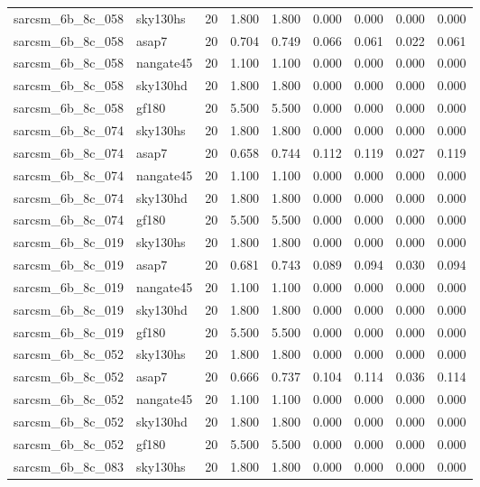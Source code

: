 \begin{tabular}{llrrrrrrr}
sarcsm\_6b\_8c\_058 & sky130hs & 20 & 1.800 & 1.800 & 0.000 & 0.000 & 0.000 & 0.000 \\
sarcsm\_6b\_8c\_058 & asap7 & 20 & 0.704 & 0.749 & 0.066 & 0.061 & 0.022 & 0.061 \\
sarcsm\_6b\_8c\_058 & nangate45 & 20 & 1.100 & 1.100 & 0.000 & 0.000 & 0.000 & 0.000 \\
sarcsm\_6b\_8c\_058 & sky130hd & 20 & 1.800 & 1.800 & 0.000 & 0.000 & 0.000 & 0.000 \\
sarcsm\_6b\_8c\_058 & gf180 & 20 & 5.500 & 5.500 & 0.000 & 0.000 & 0.000 & 0.000 \\
sarcsm\_6b\_8c\_074 & sky130hs & 20 & 1.800 & 1.800 & 0.000 & 0.000 & 0.000 & 0.000 \\
sarcsm\_6b\_8c\_074 & asap7 & 20 & 0.658 & 0.744 & 0.112 & 0.119 & 0.027 & 0.119 \\
sarcsm\_6b\_8c\_074 & nangate45 & 20 & 1.100 & 1.100 & 0.000 & 0.000 & 0.000 & 0.000 \\
sarcsm\_6b\_8c\_074 & sky130hd & 20 & 1.800 & 1.800 & 0.000 & 0.000 & 0.000 & 0.000 \\
sarcsm\_6b\_8c\_074 & gf180 & 20 & 5.500 & 5.500 & 0.000 & 0.000 & 0.000 & 0.000 \\
sarcsm\_6b\_8c\_019 & sky130hs & 20 & 1.800 & 1.800 & 0.000 & 0.000 & 0.000 & 0.000 \\
sarcsm\_6b\_8c\_019 & asap7 & 20 & 0.681 & 0.743 & 0.089 & 0.094 & 0.030 & 0.094 \\
sarcsm\_6b\_8c\_019 & nangate45 & 20 & 1.100 & 1.100 & 0.000 & 0.000 & 0.000 & 0.000 \\
sarcsm\_6b\_8c\_019 & sky130hd & 20 & 1.800 & 1.800 & 0.000 & 0.000 & 0.000 & 0.000 \\
sarcsm\_6b\_8c\_019 & gf180 & 20 & 5.500 & 5.500 & 0.000 & 0.000 & 0.000 & 0.000 \\
sarcsm\_6b\_8c\_052 & sky130hs & 20 & 1.800 & 1.800 & 0.000 & 0.000 & 0.000 & 0.000 \\
sarcsm\_6b\_8c\_052 & asap7 & 20 & 0.666 & 0.737 & 0.104 & 0.114 & 0.036 & 0.114 \\
sarcsm\_6b\_8c\_052 & nangate45 & 20 & 1.100 & 1.100 & 0.000 & 0.000 & 0.000 & 0.000 \\
sarcsm\_6b\_8c\_052 & sky130hd & 20 & 1.800 & 1.800 & 0.000 & 0.000 & 0.000 & 0.000 \\
sarcsm\_6b\_8c\_052 & gf180 & 20 & 5.500 & 5.500 & 0.000 & 0.000 & 0.000 & 0.000 \\
sarcsm\_6b\_8c\_083 & sky130hs & 20 & 1.800 & 1.800 & 0.000 & 0.000 & 0.000 & 0.000 \\

\end{tabular}
